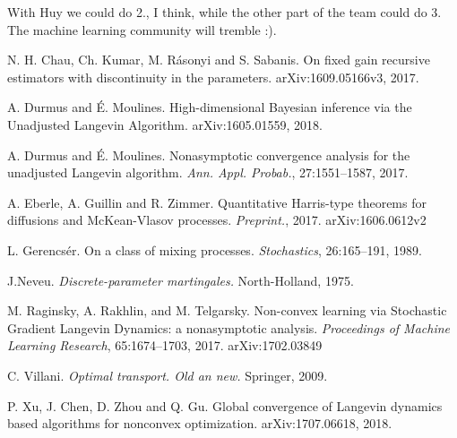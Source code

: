 \documentclass[a4paper,draft]{article}
\begin{document}
With Huy we could do 2., I think, while the other part of the team could do 3. 
The machine learning community will tremble :).

\begin{thebibliography}{00}

 N. H. Chau, Ch. Kumar, M. R\'asonyi and S. Sabanis.
\newblock On fixed gain recursive estimators with discontinuity in the parameters.
\newblock arXiv:1609.05166v3, 2017.

 A. Durmus and \'E. Moulines.
\newblock High-dimensional Bayesian inference via the Unadjusted
Langevin Algorithm.
\newblock arXiv:1605.01559, 2018.

 A. Durmus and \'E. Moulines.
\newblock Nonasymptotic convergence analysis for the unadjusted Langevin algorithm.
\newblock \emph{Ann. Appl. Probab.}, 27:1551--1587, 2017.

 A. Eberle, A. Guillin and R. Zimmer.
\newblock Quantitative Harris-type theorems for diffusions and
McKean-Vlasov processes. \newblock\emph{Preprint.}, 2017.
\newblock arXiv:1606.0612v2

 L. Gerencs\'er.
\newblock On a class of mixing processes.
\newblock \emph{Stochastics},  26:165--191, 1989.

 J.Neveu.
\newblock\emph{Discrete-parameter martingales.}
\newblock North-Holland, 1975.

M. Raginsky, A. Rakhlin, and M. Telgarsky.
\newblock Non-convex learning via Stochastic Gradient Langevin Dynamics: a nonasymptotic analysis.
\newblock \emph{Proceedings of Machine Learning Research}, 65:1674--1703, 2017. \newblock arXiv:1702.03849

 C. Villani.
\newblock \emph{Optimal transport. Old an new.}
\newblock Springer, 2009.

 P. Xu, J. Chen, D. Zhou and Q. Gu.
\newblock Global convergence of Langevin dynamics based
algorithms for nonconvex optimization.
\newblock arXiv:1707.06618, 2018.

\end{thebibliography}
\end{document}
